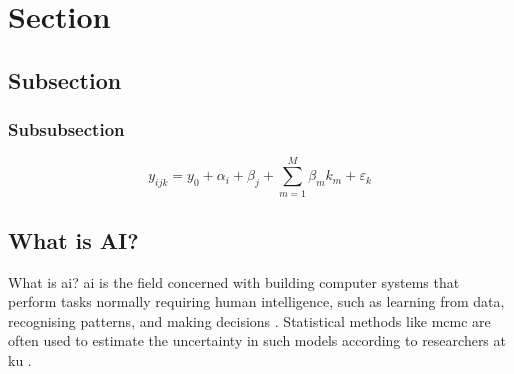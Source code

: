 \section{Section}
\lipsum[1]

\subsection{Subsection}
\lipsum[2-3]

\subsubsection{Subsubsection}
\lipsum[4]

\begin{equation}
    y_{ijk} = y_0 + \alpha_i + \beta_j + \sum_{m=1}^{M} \beta_m k_m + \varepsilon_k
\end{equation}

\lipsum[5]

\subsection{What is AI?}

What is \ac{ai}? \ac{ai} is the field concerned with building computer systems that perform tasks normally requiring human intelligence, such as learning from data, recognising patterns, and making decisions \cite{wuMolecularInformationSensomics2026a}. Statistical methods like \ac{mcmc} are often used to estimate the uncertainty in such models according to researchers at \ac{ku} \cite{hahnEvaluationNonvolatileChemistry2018}.